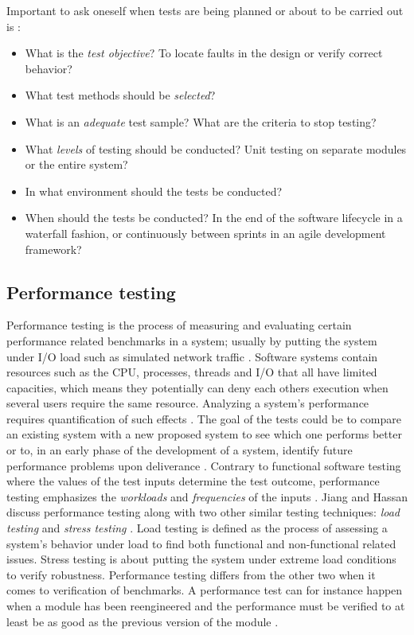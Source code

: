 Important to ask oneself when tests are being planned or about to be carried
out is \cite{bertolino2007software}:

\begin{itemize}
  \item What is the \textit{test objective}? To locate faults in the design or
    verify correct behavior?
  \item What test methods should be \textit{selected}?
  \item What is an \textit{adequate} test sample? What are the criteria to stop
    testing?
  \item What \textit{levels} of testing should be conducted? Unit testing on
    separate modules or the entire system?
  \item In what environment should the tests be conducted?
  \item When should the tests be conducted? In the end of the software
    lifecycle in a waterfall fashion, or continuously between sprints in an
    agile development framework?
\end{itemize}

\subsection{Performance testing}

Performance testing is the process of measuring and evaluating certain
performance related benchmarks in a system; usually by putting the system under
I/O load such as simulated network traffic \cite{jiang2015survey}. Software
systems contain resources such as the CPU, processes, threads and I/O that all
have limited capacities, which means they potentially can deny each others
execution when several users require the same resource. Analyzing a system's
performance requires quantification of such effects \cite{woodside2007future}.
The goal of the tests could be to compare an existing system with a new
proposed system to see which one performs better \cite{avritzer1996deriving} or
to, in an early phase of the development of a system, identify future
performance problems upon deliverance \cite{weyuker2000experience}. Contrary to
functional software testing where the values of the test inputs determine the
test outcome, performance testing emphasizes the \textit{workloads} and
\textit{frequencies} of the inputs \cite{weyuker2000experience}. Jiang and
Hassan discuss performance testing along with two other similar testing
techniques: \textit{load testing} and \textit{stress testing}
\cite{jiang2015survey}. Load testing is defined as the process of assessing a
system's behavior under load to find both functional and non-functional related
issues. Stress testing is about putting the system under extreme load
conditions to verify robustness.  Performance testing differs from the other
two when it comes to verification of benchmarks. A performance test can for
instance happen when a module has been reengineered and the performance must be
verified to at least be as good as the previous version of the module
\cite{jiang2015survey}.

